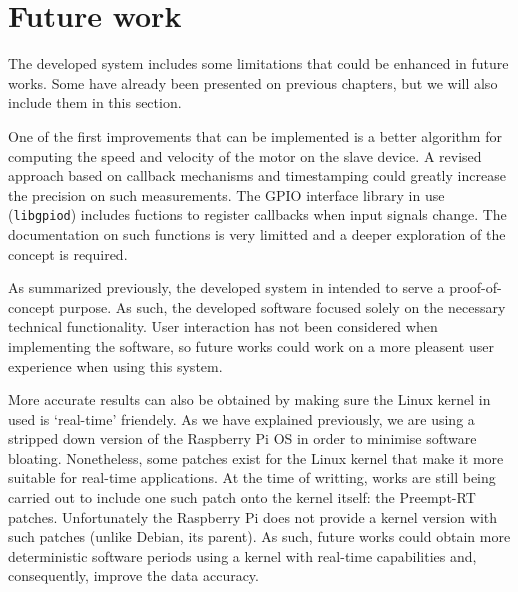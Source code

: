 \section{Future work} \label{sec:future-work}
The developed system includes some limitations that could be enhanced in future works.
Some have already been presented on previous chapters, but we will also include them in this section.

One of the first improvements that can be implemented is a better algorithm for computing the speed and velocity of the motor on the slave device.
A revised approach based on callback mechanisms and timestamping could greatly increase the precision on such measurements.
The GPIO interface library in use (\verb|libgpiod|) includes fuctions to register callbacks when input signals change.
The documentation on such functions is very limitted and a deeper exploration of the concept is required.

As summarized previously, the developed system in intended to serve a proof-of-concept purpose.
As such, the developed software focused solely on the necessary technical functionality.
User interaction has not been considered when implementing the software, so future works could work on a more pleasent user experience when using this system.

More accurate results can also be obtained by making sure the Linux kernel in used is `real-time' friendely.
As we have explained previously, we are using a stripped down version of the Raspberry Pi OS in order to minimise software bloating.
Nonetheless, some patches exist for the Linux kernel that make it more suitable for real-time applications.
At the time of writting, works are still being carried out to include one such patch onto the kernel itself: the Preempt-RT patches.
Unfortunately the Raspberry Pi does not provide a kernel version with such patches (unlike Debian, its parent).
As such, future works could obtain more deterministic software periods using a kernel with real-time capabilities and, consequently, improve the data accuracy.
